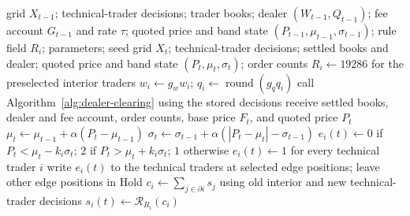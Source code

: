 \begin{algorithm}[!ht]
\caption{One market step, $t-1\rightarrow t$, in simulation order.
Stored decisions generated orders. Clearing determined a common execution
price, and the settled dealer reserves set the new quoted price.}
\label{alg:model-step}
\begin{algorithmic}[1]
\REQUIRE grid $X_{t-1}$; technical-trader decisions; trader books; dealer
$(W_{t-1},Q_{t-1})$; fee account $G_{t-1}$ and rate $\tau$;
quoted price and band state $(P_{t-1},\mu_{t-1},\sigma_{t-1})$;
rule field $R_i$; parameters; seed
\ENSURE grid $X_t$; technical-trader decisions; settled books and dealer;
quoted price and band state $(P_t,\mu_t,\sigma_t)$; order counts
 \STATE $R_i\leftarrow19286$ for the preselected interior traders
\ENDIF
{}
  \STATE $w_i\leftarrow g_w w_i$; $q_i\leftarrow\operatorname{round}(g_q q_i)$
 \ENDFOR
\ENDIF
\STATE call Algorithm~\ref{alg:dealer-clearing} using the stored decisions
\STATE receive settled books, dealer and fee account, order counts, base
price $F_t$, and quoted price $P_t$
\STATE $\mu_t\leftarrow\mu_{t-1}+\alpha(P_t-\mu_{t-1})$
\STATE $\sigma_t\leftarrow\sigma_{t-1}+\alpha(|P_t-\mu_t|-\sigma_{t-1})$
  \STATE $e_i(t)\leftarrow0$ if $P_t<\mu_t-k_i\sigma_t$; $2$ if
  $P_t>\mu_t+k_i\sigma_t$; $1$ otherwise
 \ENDFOR
\ELSE
 \STATE $e_i(t)\leftarrow1$ for every technical trader $i$
\ENDIF
\STATE write $e_i(t)$ to the technical traders at selected edge
positions; leave other edge positions in Hold
 \STATE $c_i\leftarrow\sum_{j\in\partial i}s_j$ using old interior and new technical-trader decisions
 \STATE $s_i(t)\leftarrow\mathcal{R}_{R_i}(c_i)$
\ENDFOR
\end{algorithmic}
\end{algorithm}

